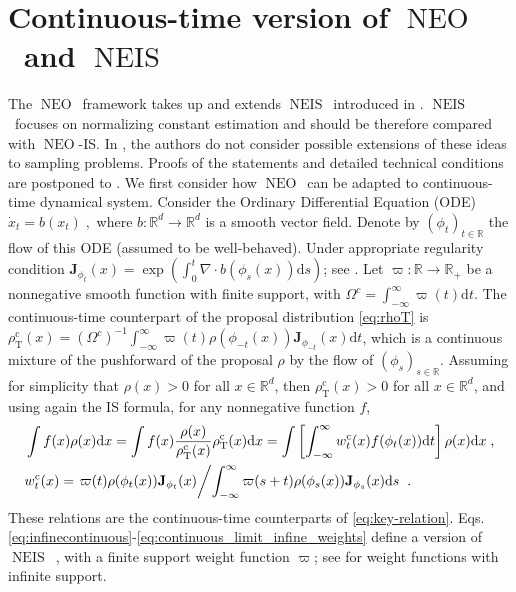 \documentclass{article}
\def\IFIS{\ensuremath{\operatorname{NEO}}}
\def\NEO{{\small \IFIS}}
\def\transfo{\operatorname{T}}
\def\rmd{\operatorname{d}\hspace{-2pt}}
\def\rset{\mathbb{R}}
\def\rmd{\mathrm{d}}
\def\eqsp{\,}
\def\eqsp{\;}
\newcommand{\1}{\mathds{1}}
\def\proposal{\rho}
\def\Jac{\mathbf{J}}
\newcommand{\JacOp}[1]{\Jac_{#1}}
\def\rset{\mathbb{R}}
\def\rmd{\mathrm{d}}
\def\rhoT{\rho_{\transfo}}
\def\NEIS{\ensuremath{\operatorname{NEIS}}}
\def\wcont{w_t^\mathrm{c}}
\def\rhoTcont{\rhoT^{\operatorname{c}}}
\begin{document}
\section{Continuous-time version of \IFIS\ and \NEIS}
The \NEO\ framework takes up and extends \NEIS\ introduced in \cite{rotskoff:vanden-eijden:2019}.  \NEIS\ focuses on normalizing constant estimation and should be therefore compared with \NEO-IS. In \cite{rotskoff:vanden-eijden:2019}, the authors do not consider possible extensions of these ideas to sampling problems. Proofs of the statements and detailed technical conditions are postponed to  .
We first consider how \NEO\ can be adapted to continuous-time dynamical system. 
Consider the Ordinary Differential Equation (ODE) $\dot{x}_t = b(x_t)\eqsp,$ where $b\colon\rset^d\to\rset^d$ is a smooth vector field. Denote by $(\phi_t)_{t\in\rset}$ the flow of this ODE (assumed to be well-behaved). Under appropriate regularity condition $ \JacOp{\phi_t}(x) = \exp(\int_0^t\nabla\cdot b(\phi_s(x))\rmd s)$; see . Let  $\varpi: \rset \to \rset_+$ be a nonnegative smooth function with finite support, with $\Omega^c = \int_{-\infty}^{\infty} \varpi(t)\rmd t$.
The continuous-time counterpart of the proposal distribution \eqref{eq:rhoT} is $\rhoTcont(x) =(\Omega^c)^{-1} \int_{-\infty}^\infty \varpi(t) \rho(\phi_{-t}(x))\JacOp{\phi_{-t}}(x)\rmd t$, which is a continuous mixture of the pushforward of the proposal $\proposal$ by the flow of $( \phi_{s} )_{s \in\rset}$. 
Assuming for simplicity that $\proposal(x) > 0$ for all $x \in \rset^d$, then $\rhoTcont(x) > 0$ for all $x \in \rset^d$, and using again the IS formula, for any nonnegative function $f$, 
\begin{align}
\label{eq:infinecontinuous}
    &\int f(x) \rho(x) \rmd x = \int f(x) \frac{\rho(x)}{\rhoTcont(x)}\rhoTcont(x) \rmd x= \int \left[\int_{-\infty}^{\infty} \wcont(x) f(\phi_t(x))\rmd t\right]\rho(x) \rmd x\eqsp,\\
\label{eq:continuous_limit_infine_weights}
   &\wcont( x) = \left.{\varpi(t)\rho(\phi_t(x)) \JacOp{\phi_t}(x)}\middle/{\int_{-\infty}^{\infty}\varpi({s+t})\rho(\phi_s(x)) \JacOp{\phi_s}(x)\rmd s}\right.\eqsp.
\end{align}
These relations are the continuous-time counterparts of \eqref{eq:key-relation}. Eqs. \eqref{eq:infinecontinuous}-\eqref{eq:continuous_limit_infine_weights} define a version of \NEIS\  \cite{rotskoff:vanden-eijden:2019}, with a finite support weight function $\varpi$; see  for weight functions with infinite support. 
\end{document}
